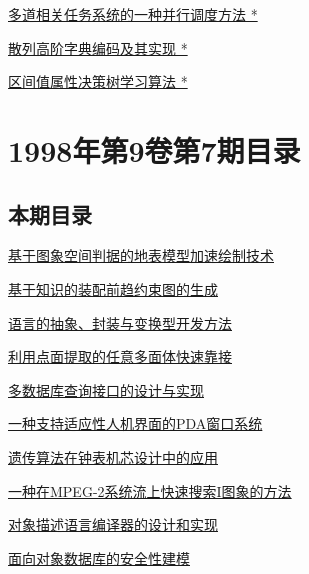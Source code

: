 \documentclass[a4paper]{article}
\begin{document}
\href{http://www.jos.org.cn/ch/reader/download_pdf.aspx?file_no=19980814&year_id=1998&quarter_id=8&falg=1}{多道相关任务系统的一种并行调度方法 *}

\href{http://www.jos.org.cn/ch/reader/download_pdf.aspx?file_no=19980815&year_id=1998&quarter_id=8&falg=1}{散列高阶字典编码及其实现 *}

\href{http://www.jos.org.cn/ch/reader/download_pdf.aspx?file_no=19980816&year_id=1998&quarter_id=8&falg=1}{区间值属性决策树学习算法 *}


\section{\textbf{1998年第9卷第7期目录}}
\subsection{本期目录}
\href{http://www.jos.org.cn/ch/reader/download_pdf.aspx?file_no=19980701&year_id=1998&quarter_id=7&falg=1}{基于图象空间判据的地表模型加速绘制技术}

\href{http://www.jos.org.cn/ch/reader/download_pdf.aspx?file_no=19980702&year_id=1998&quarter_id=7&falg=1}{基于知识的装配前趋约束图的生成}

\href{http://www.jos.org.cn/ch/reader/download_pdf.aspx?file_no=19980703&year_id=1998&quarter_id=7&falg=1}{语言的抽象、封装与变换型开发方法}

\href{http://www.jos.org.cn/ch/reader/download_pdf.aspx?file_no=19980704&year_id=1998&quarter_id=7&falg=1}{利用点面提取的任意多面体快速靠接}

\href{http://www.jos.org.cn/ch/reader/download_pdf.aspx?file_no=19980705&year_id=1998&quarter_id=7&falg=1}{多数据库查询接口的设计与实现}

\href{http://www.jos.org.cn/ch/reader/download_pdf.aspx?file_no=19980706&year_id=1998&quarter_id=7&falg=1}{一种支持适应性人机界面的PDA窗口系统}

\href{http://www.jos.org.cn/ch/reader/download_pdf.aspx?file_no=19980707&year_id=1998&quarter_id=7&falg=1}{遗传算法在钟表机芯设计中的应用}

\href{http://www.jos.org.cn/ch/reader/download_pdf.aspx?file_no=19980708&year_id=1998&quarter_id=7&falg=1}{一种在MPEG-2系统流上快速搜索I图象的方法}

\href{http://www.jos.org.cn/ch/reader/download_pdf.aspx?file_no=19980709&year_id=1998&quarter_id=7&falg=1}{对象描述语言编译器的设计和实现}

\href{http://www.jos.org.cn/ch/reader/download_pdf.aspx?file_no=19980710&year_id=1998&quarter_id=7&falg=1}{面向对象数据库的安全性建模}
\end{document}
